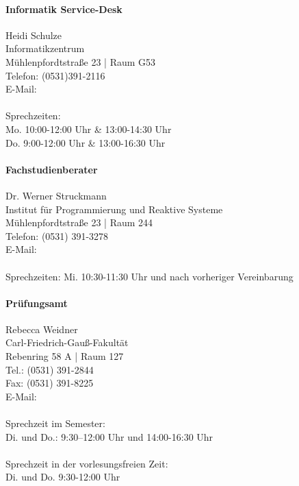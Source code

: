 \paragraph{\small Informatik Service-Desk}
Heidi Schulze\\
Informatikzentrum\\
Mühlenpfordtstraße 23 | Raum G53\\
Telefon: (0531)391-2116\\
E-Mail: \\
\\
Sprechzeiten: \\
Mo. 10:00-12:00 Uhr
\& 13:00-14:30 Uhr
\\
Do. 9:00-12:00 Uhr
\& 13:00-16:30 Uhr

\paragraph{\small{Fachstudienberater}}
Dr. Werner Struckmann\\
Institut für Programmierung und Reaktive Systeme\\
Mühlenpfordtstraße 23 | Raum 244\\
Telefon: (0531) 391-3278\\
E-Mail: \\
\\
Sprechzeiten: Mi. 10:30-11:30 Uhr und nach vorheriger Vereinbarung

\paragraph{\small{Prüfungsamt}}
Rebecca Weidner\\
Carl-Friedrich-Gauß-Fakultät\\
Rebenring 58 A | Raum 127\\
Tel.: (0531) 391-2844\\
Fax: (0531) 391-8225\\
E-Mail: \\
\\
Sprechzeit im Semester:\\
Di. und Do.:
9:30–12:00 Uhr und 14:00-16:30 Uhr\\
\\
Sprechzeit in der vorlesungsfreien Zeit:\\
Di. und Do.
9:30-12:00 Uhr \\
